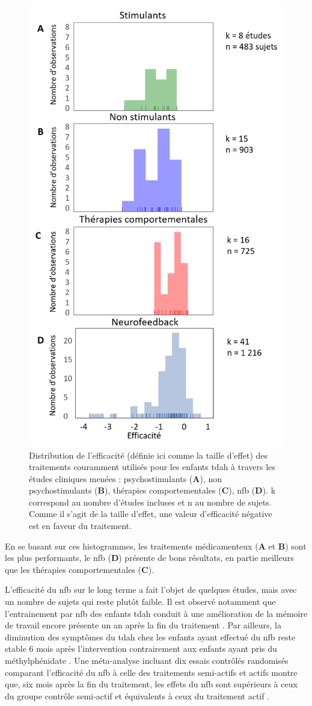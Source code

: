 \begin{figure}[h!]
  \centering
	\includegraphics[width=0.5\linewidth]{figures/chapter-1/introduction-efficacy-treatments} 
  \caption[Visualisation de l'efficacité des traitement couramment utilisés dans le cadre du \gls{tdah}.]{Distribution de l'efficacité (définie ici comme la taille d'effet) 
	des traitements couramment utilisés pour les enfants \gls{tdah} à travers les études cliniques menées : 
	psychostimulants (\textbf{A}), non psychostimulants (\textbf{B}), thérapies comportementales (\textbf{C}), \gls{nfb} (\textbf{D}). k correspond au nombre
	d'études incluses et n au nombre de sujets. 
	Comme il s'agit de la taille d'effet, une valeur d'efficacité négative est en faveur du traitement.}
  \label{Figure:introduction-efficacy-treatments}
\end{figure}

En se basant sur ces histogrammes, les traitements médicamenteux (\textbf{A} et \textbf{B}) sont les plus performants, le \gls{nfb} (\textbf{D}) présente de bons
résultats, en partie meilleurs que les thérapies comportementales (\textbf{C}). 

L'efficacité du \gls{nfb} sur le long terme a fait l'objet de quelques études, mais avec un nombre de sujets qui reste plutôt faible. Il est observé notamment
que l'entrainement par \gls{nfb} des enfants \gls{tdah} conduit à une amélioration de la mémoire de travail encore présente un an après la fin du traitement
\citep{Dobrakowski2019}. Par ailleurs, la diminution des symptômes du \gls{tdah} chez les enfants ayant effectué du \gls{nfb} reste stable 6 mois après 
l'intervention contrairement aux enfants ayant pris du méthylphénidate \citep{Gelade2018}. Une méta-analyse incluant dix essais contrôlés randomisés comparant l'efficacité du \gls{nfb}
à celle des traitements semi-actifs et actifs montre que, six mois après la fin du traitement, les effets du \gls{nfb} sont supérieurs à ceux du groupe contrôle semi-actif
et équivalents à ceux du traitement actif \citep{VanDoren2019}.  

